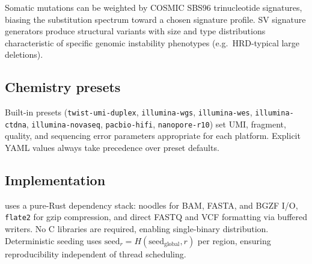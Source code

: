 Somatic mutations can be weighted by COSMIC SBS96 trinucleotide signatures, biasing the substitution spectrum toward a chosen signature profile.
SV signature generators produce structural variants with size and type distributions characteristic of specific genomic instability phenotypes (e.g.\ HRD-typical large deletions).

\subsection{Chemistry presets}

Built-in presets (\texttt{twist-umi-duplex}, \texttt{illumina-wgs}, \texttt{illumina-wes}, \texttt{illumina-ctdna}, \texttt{illumina-novaseq}, \texttt{pacbio-hifi}, \texttt{nanopore-r10}) set UMI, fragment, quality, and sequencing error parameters appropriate for each platform.
Explicit YAML values always take precedence over preset defaults.

\subsection{Implementation}

\varforge{} uses a pure-Rust dependency stack: noodles\autocite{noodles} for BAM, FASTA, and BGZF I/O, \texttt{flate2} for gzip compression, and direct FASTQ and VCF formatting via buffered writers.
No C libraries are required, enabling single-binary distribution.
Deterministic seeding uses $\text{seed}_r = H(\text{seed}_\text{global}, r)$ per region, ensuring reproducibility independent of thread scheduling.
